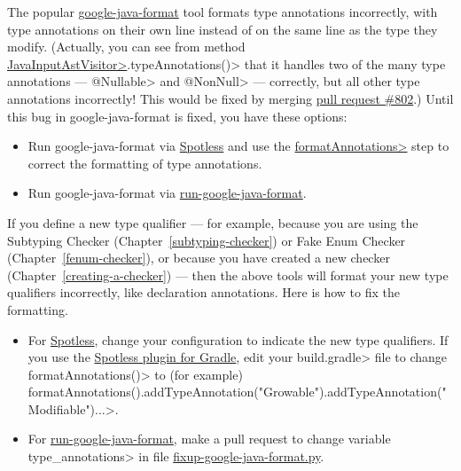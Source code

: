 The popular
\href{https://github.com/google/google-java-format}{google-java-format}
tool formats type annotations incorrectly, with type annotations on their
own line instead of on the same line as the type they modify.  (Actually,
you can see from method \href{https://github.com/google/google-java-format/blob/master/core/src/main/java/com/google/googlejavaformat/java/JavaInputAstVisitor.java}{\<JavaInputAstVisitor>}\<.typeAnnotations()> that
it handles two of the many type annotations --- \<@Nullable> and \<@NonNull> --- correctly,
but all other type annotations incorrectly!  This would be fixed by merging
\href{https://github.com/google/google-java-format/pull/802}{pull request
  \#802}.)
Until this bug in google-java-format is fixed, you have these options:
\begin{itemize}
\item
  Run google-java-format via
  \href{https://github.com/diffplug/spotless}{Spotless} and use the
  \href{https://github.com/diffplug/spotless/tree/main/plugin-gradle#formatannotations}{\<formatAnnotations>}
  step to correct the formatting of type annotations.
\item
  Run google-java-format via \href{https://github.com/plume-lib/run-google-java-format}{run-google-java-format}.
\end{itemize}

If you define a new type qualifier --- for example, because you are using the
Subtyping Checker (Chapter~\ref{subtyping-checker}) or Fake Enum Checker
(Chapter~\ref{fenum-checker}), or because you have created a new checker
(Chapter~\ref{creating-a-checker}) --- then the above tools will format
your new type qualifiers incorrectly, like declaration annotations.  Here is
how to fix the formatting.

\begin{itemize}
\item
  For \href{https://github.com/diffplug/spotless}{Spotless}, change your
  configuration to indicate the new type qualifiers.  If you use the
  \href{https://github.com/diffplug/spotless/tree/main/plugin-gradle}{Spotless
  plugin for Gradle}, edit your \<build.gradle> file to change
  \<formatAnnotations()> to (for example)
  \<formatAnnotations().addTypeAnnotation("Growable").addTypeAnnotation("Modifiable")...>.
\item
  For
  \href{https://github.com/plume-lib/run-google-java-format}{run-google-java-format},
  make a pull request to change variable \<type\_annotations> in file
  \href{https://github.com/plume-lib/run-google-java-format/blob/master/fixup-google-java-format.py}{fixup-google-java-format.py}.
\end{itemize}


